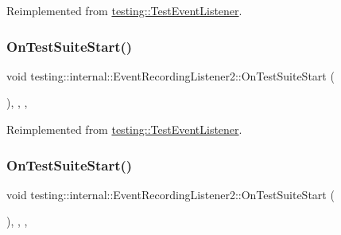 Reimplemented from \mbox{\hyperlink{classtesting_1_1_test_event_listener_a8962caad5d2522c9160c794074a662ee}{testing\+::\+Test\+Event\+Listener}}.

\mbox{\label{classtesting_1_1internal_1_1_event_recording_listener2_a6bc3ac71f7f96e9c62b0c7dffd5f66b0}} 
\subsubsection{\texorpdfstring{OnTestSuiteStart()}{OnTestSuiteStart()}\hspace{0.1cm}{\footnotesize\ttfamily [1/2]}}
{\footnotesize\ttfamily void testing\+::internal\+::\+Event\+Recording\+Listener2\+::\+On\+Test\+Suite\+Start (\begin{DoxyParamCaption}\item[{const \mbox{\hyperlink{classtesting_1_1_test_suite}{Test\+Suite}} \&}]{ }\end{DoxyParamCaption})\hspace{0.3cm}{\ttfamily [inline]}, {\ttfamily [override]}, {\ttfamily [protected]}, {\ttfamily [virtual]}}



Reimplemented from \mbox{\hyperlink{classtesting_1_1_test_event_listener_a2726cc70dfda861f109355f1d9f09dfe}{testing\+::\+Test\+Event\+Listener}}.

\mbox{\label{classtesting_1_1internal_1_1_event_recording_listener2_a6bc3ac71f7f96e9c62b0c7dffd5f66b0}} 
\subsubsection{\texorpdfstring{OnTestSuiteStart()}{OnTestSuiteStart()}\hspace{0.1cm}{\footnotesize\ttfamily [2/2]}}
{\footnotesize\ttfamily void testing\+::internal\+::\+Event\+Recording\+Listener2\+::\+On\+Test\+Suite\+Start (\begin{DoxyParamCaption}\item[{const \mbox{\hyperlink{classtesting_1_1_test_suite}{Test\+Suite}} \&}]{ }\end{DoxyParamCaption})\hspace{0.3cm}{\ttfamily [inline]}, {\ttfamily [override]}, {\ttfamily [protected]}, {\ttfamily [virtual]}}



